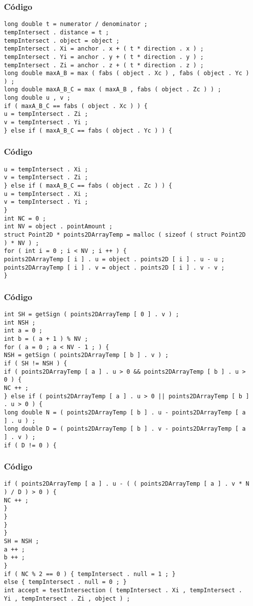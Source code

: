 \documentclass{beamer}
\begin{document}
\begin{frame}[fragile]
\frametitle{C\'odigo}
\begin{verbatim}
long double t = numerator / denominator ; 
tempIntersect . distance = t ; 
tempIntersect . object = object ; 
tempIntersect . Xi = anchor . x + ( t * direction . x ) ; 
tempIntersect . Yi = anchor . y + ( t * direction . y ) ; 
tempIntersect . Zi = anchor . z + ( t * direction . z ) ; 
long double maxA_B = max ( fabs ( object . Xc ) , fabs ( object . Yc ) ) ; 
long double maxA_B_C = max ( maxA_B , fabs ( object . Zc ) ) ; 
long double u , v ; 
if ( maxA_B_C == fabs ( object . Xc ) ) { 
u = tempIntersect . Zi ; 
v = tempIntersect . Yi ; 
} else if ( maxA_B_C == fabs ( object . Yc ) ) { 
\end{verbatim}
\end{frame}
\begin{frame}[fragile]
\frametitle{C\'odigo}
\begin{verbatim}
u = tempIntersect . Xi ; 
v = tempIntersect . Zi ; 
} else if ( maxA_B_C == fabs ( object . Zc ) ) { 
u = tempIntersect . Xi ; 
v = tempIntersect . Yi ; 
} 
int NC = 0 ; 
int NV = object . pointAmount ; 
struct Point2D * points2DArrayTemp = malloc ( sizeof ( struct Point2D ) * NV ) ; 
for ( int i = 0 ; i < NV ; i ++ ) { 
points2DArrayTemp [ i ] . u = object . points2D [ i ] . u - u ; 
points2DArrayTemp [ i ] . v = object . points2D [ i ] . v - v ; 
} 
\end{verbatim}
\end{frame}
\begin{frame}[fragile]
\frametitle{C\'odigo}
\begin{verbatim}
int SH = getSign ( points2DArrayTemp [ 0 ] . v ) ; 
int NSH ; 
int a = 0 ; 
int b = ( a + 1 ) % NV ; 
for ( a = 0 ; a < NV - 1 ; ) { 
NSH = getSign ( points2DArrayTemp [ b ] . v ) ; 
if ( SH != NSH ) { 
if ( points2DArrayTemp [ a ] . u > 0 && points2DArrayTemp [ b ] . u > 0 ) { 
NC ++ ; 
} else if ( points2DArrayTemp [ a ] . u > 0 || points2DArrayTemp [ b ] . u > 0 ) { 
long double N = ( points2DArrayTemp [ b ] . u - points2DArrayTemp [ a ] . u ) ; 
long double D = ( points2DArrayTemp [ b ] . v - points2DArrayTemp [ a ] . v ) ; 
if ( D != 0 ) { 
\end{verbatim}
\end{frame}
\begin{frame}[fragile]
\frametitle{C\'odigo}
\begin{verbatim}
if ( points2DArrayTemp [ a ] . u - ( ( points2DArrayTemp [ a ] . v * N ) / D ) > 0 ) { 
NC ++ ; 
} 
} 
} 
} 
SH = NSH ; 
a ++ ; 
b ++ ; 
} 
if ( NC % 2 == 0 ) { tempIntersect . null = 1 ; } 
else { tempIntersect . null = 0 ; } 
int accept = testIntersection ( tempIntersect . Xi , tempIntersect . Yi , tempIntersect . Zi , object ) ; 
\end{verbatim}
\end{frame}
\end{document}

